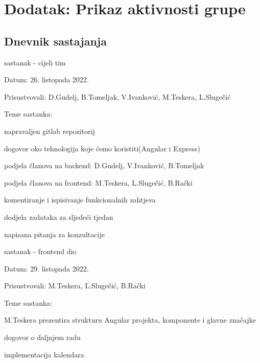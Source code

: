 \chapter*{Dodatak: Prikaz aktivnosti grupe}
		
		\section*{Dnevnik sastajanja}
		
		\begin{packed_enum}
			\item  sastanak - cijeli tim
			\item[] \begin{packed_item}
				\item Datum: 26. listopada 2022.
				\item Prisustvovali: D.Gudelj, B.Tomeljak, V.Ivanković, M.Teskera, L.Slugečić
				\item Teme sastanka:
				\begin{packed_item}
					\item  napravaljen gitlab repozitorij
					\item  dogovor oko tehnologija koje ćemo koristiti(Angular i Express)
					\item podjela članova na backend: D.Gudelj, V.Ivanković, B.Tomeljak
					\item podjela članova na frontend: M.Teskera, L.Slugečić, B.Rački
					\item komentiranje i ispisivanje funkcionalnih zahtjeva
					\item dodjela zadataka za sljedeći tjedan
					\item napisana pitanja za konzultacije
				\end{packed_item}
			\end{packed_item}
			
			\item  sastanak - frontend dio
			\item[] \begin{packed_item}
				\item Datum: 29. listopada 2022.
				\item Prisustvovali: M.Teskera, L.Slugečić, B.Rački
				\item Teme sastanka:
				\begin{packed_item}
					\item M.Teskera prezentira strukturu Angular projekta, komponente i glavne značajke
					\item dogovor o daljnjem radu
					\item implementacija kalendara
				\end{packed_item}
			\end{packed_item}
			

\end{packed_enum}
